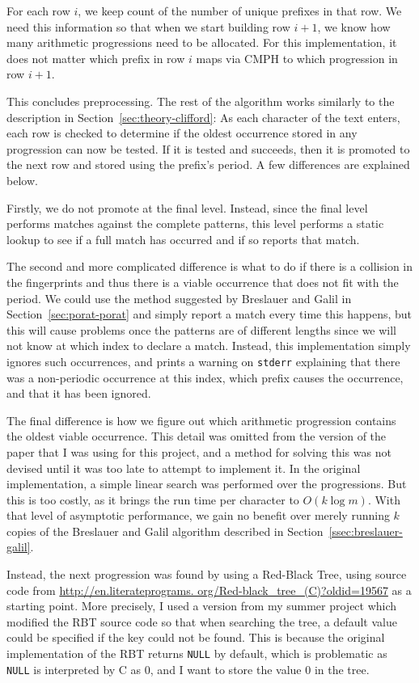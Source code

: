 \documentclass[ %
                    author={Dominic Joseph Moylett},
                    degree={MEng},
                     title={Dictionary Matching with Fingerprints},
                  subtitle={An Empirical Analysis},
                      type={research},
                      year={2015} ]{dissertation}
\begin{document}
For each row $i$, we keep count of the number of unique prefixes in that row. We need this information so that when we start building row $i+1$, we know how many arithmetic progressions need to be allocated. For this implementation, it does not matter which prefix in row $i$ maps via CMPH to which progression in row $i+1$.

This concludes preprocessing. The rest of the algorithm works similarly to the description in Section~\ref{sec:theory-clifford}: As each character of the text enters, each row is checked to determine if the oldest occurrence stored in any progression can now be tested. If it is tested and succeeds, then it is promoted to the next row and stored using the prefix's period. A few differences are explained below.

Firstly, we do not promote at the final level. Instead, since the final level performs matches against the complete patterns, this level performs a static lookup to see if a full match has occurred and if so reports that match.

The second and more complicated difference is what to do if there is a collision in the fingerprints and thus there is a viable occurrence that does not fit with the period. We could use the method suggested by Breslauer and Galil in Section~\ref{sec:porat-porat} and simply report a match every time this happens, but this will cause problems once the patterns are of different lengths since we will not know at which index to declare a match. Instead, this implementation simply ignores such occurrences, and prints a warning on \texttt{stderr} explaining that there was a non-periodic occurrence at this index, which prefix causes the occurrence, and that it has been ignored.

The final difference is how we figure out which arithmetic progression contains the oldest viable occurrence. This detail was omitted from the version of the paper that I was using for this project, and a method for solving this was not devised until it was too late to attempt to implement it. In the original implementation, a simple linear search was performed over the progressions. But this is too costly, as it brings the run time per character to $O(k\log m)$. With that level of asymptotic performance, we gain no benefit over merely running $k$ copies of the Breslauer and Galil algorithm described in Section~\ref{ssec:breslauer-galil}.

Instead, the next progression was found by using a Red-Black Tree, using source code from \url{http://en.literateprograms.
org/Red-black_tree_(C)?oldid=19567} as a starting point. More precisely, I used a version from my summer project which modified the RBT source code so that when searching the tree, a default value could be specified if the key could not be found. This is because the original implementation of the RBT returns \texttt{NULL} by default, which is problematic as \texttt{NULL} is interpreted by C as 0, and I want to store the value 0 in the tree.
\end{document}
